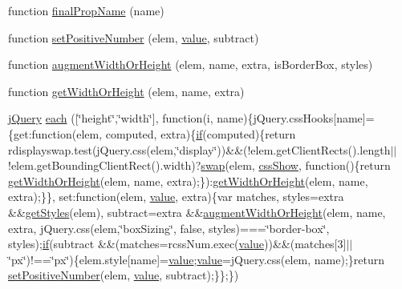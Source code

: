 \begin{DoxyCompactItemize}
function \hyperlink{jquery-3_82_81_8js_a859b0766b1950fac7bae8f9569899423}{final\+Prop\+Name} (name)
\item 
function \hyperlink{jquery-3_82_81_8js_a049182834e8b4b2d7485cd919ed272d7}{set\+Positive\+Number} (elem, \hyperlink{jquery-3_82_81_8js_a9d32b6baf31ab8047d93bf7e388971b9}{value}, subtract)
\item 
function \hyperlink{jquery-3_82_81_8js_aacaac1f0b5ea53030522e6f5b227ce51}{augment\+Width\+Or\+Height} (elem, name, extra, is\+Border\+Box, styles)
\item 
function \hyperlink{jquery-3_82_81_8js_a6520fbbeac78eeb0f519393470dc873b}{get\+Width\+Or\+Height} (elem, name, extra)
\item 
\hyperlink{jquery-3_82_81_8js_a609525712f1102566c2b03866ceb2bba}{j\+Query} \hyperlink{jquery-3_82_81_8js_afc18c1c88f6258016343591c88f9f14d}{each} (\mbox{[}\char`\"{}height\char`\"{},\char`\"{}width\char`\"{}\mbox{]}, function(i, name)\{j\+Query.\+css\+Hooks\mbox{[}name\mbox{]}=\{get\+:function(elem, computed, extra)\{\hyperlink{jquery-3_82_81_8js_ad6cbdd9e1fadb4d9540fff933cdd6fdc}{if}(computed)\{return rdisplayswap.\+test(j\+Query.\+css(elem,\char`\"{}display\char`\"{}))\&\&(!elem.\+get\+Client\+Rects().length$\vert$$\vert$!elem.\+get\+Bounding\+Client\+Rect().width)?\hyperlink{jquery-3_82_81_8js_a1d3525b85ad04398fea4a9eed16e2783}{swap}(elem, \hyperlink{jquery-3_82_81_8js_a2b4645641dc8710f01a9fc6cb72dfb2a}{css\+Show}, function()\{return \hyperlink{jquery-3_82_81_8js_a6520fbbeac78eeb0f519393470dc873b}{get\+Width\+Or\+Height}(elem, name, extra);\})\+:\hyperlink{jquery-3_82_81_8js_a6520fbbeac78eeb0f519393470dc873b}{get\+Width\+Or\+Height}(elem, name, extra);\}\}, set\+:function(elem, \hyperlink{jquery-3_82_81_8js_a9d32b6baf31ab8047d93bf7e388971b9}{value}, extra)\{var matches, styles=extra \&\&\hyperlink{jquery-3_82_81_8js_a9808a091e9293061932eaa058211dedd}{get\+Styles}(elem), subtract=extra \&\&\hyperlink{jquery-3_82_81_8js_aacaac1f0b5ea53030522e6f5b227ce51}{augment\+Width\+Or\+Height}(elem, name, extra, j\+Query.\+css(elem,\char`\"{}box\+Sizing\char`\"{}, false, styles)===\char`\"{}border-\/box\char`\"{}, styles);\hyperlink{jquery-3_82_81_8js_ad6cbdd9e1fadb4d9540fff933cdd6fdc}{if}(subtract \&\&(matches=rcss\+Num.\+exec(\hyperlink{jquery-3_82_81_8js_a9d32b6baf31ab8047d93bf7e388971b9}{value}))\&\&(matches\mbox{[}3\mbox{]}$\vert$$\vert$\char`\"{}px\char`\"{})!==\char`\"{}px\char`\"{})\{elem.\+style\mbox{[}name\mbox{]}=\hyperlink{jquery-3_82_81_8js_a9d32b6baf31ab8047d93bf7e388971b9}{value};\hyperlink{jquery-3_82_81_8js_a9d32b6baf31ab8047d93bf7e388971b9}{value}=j\+Query.\+css(elem, name);\}return \hyperlink{jquery-3_82_81_8js_a049182834e8b4b2d7485cd919ed272d7}{set\+Positive\+Number}(elem, \hyperlink{jquery-3_82_81_8js_a9d32b6baf31ab8047d93bf7e388971b9}{value}, subtract);\}\};\})

\end{DoxyCompactItemize}
